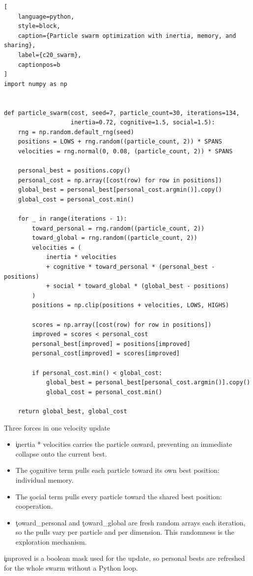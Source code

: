 \begin{lstlisting}[
    language=python,
    style=block,
    caption={Particle swarm optimization with inertia, memory, and sharing},
    label={c20_swarm},
    captionpos=b
]
import numpy as np


def particle_swarm(cost, seed=7, particle_count=30, iterations=134,
                   inertia=0.72, cognitive=1.5, social=1.5):
    rng = np.random.default_rng(seed)
    positions = LOWS + rng.random((particle_count, 2)) * SPANS
    velocities = rng.normal(0, 0.08, (particle_count, 2)) * SPANS

    personal_best = positions.copy()
    personal_cost = np.array([cost(row) for row in positions])
    global_best = personal_best[personal_cost.argmin()].copy()
    global_cost = personal_cost.min()

    for _ in range(iterations - 1):
        toward_personal = rng.random((particle_count, 2))
        toward_global = rng.random((particle_count, 2))
        velocities = (
            inertia * velocities
            + cognitive * toward_personal * (personal_best - positions)
            + social * toward_global * (global_best - positions)
        )
        positions = np.clip(positions + velocities, LOWS, HIGHS)

        scores = np.array([cost(row) for row in positions])
        improved = scores < personal_cost
        personal_best[improved] = positions[improved]
        personal_cost[improved] = scores[improved]

        if personal_cost.min() < global_cost:
            global_best = personal_best[personal_cost.argmin()].copy()
            global_cost = personal_cost.min()

    return global_best, global_cost
\end{lstlisting}

\begin{SyntaxBox}{Three forces in one velocity update}
\begin{itemize}
    \item \c{inertia * velocities} carries the particle onward, preventing an
          immediate collapse onto the current best.
    \item The \c{cognitive} term pulls each particle toward its own best
          position: individual memory.
    \item The \c{social} term pulls every particle toward the shared best
          position: cooperation.
    \item \c{toward_personal} and \c{toward_global} are fresh random arrays each
          iteration, so the pulls vary per particle and per dimension. This
          randomness is the exploration mechanism.
\end{itemize}
\c{improved} is a boolean mask used for the update, so personal bests are
refreshed for the whole swarm without a Python loop.
\end{SyntaxBox}

